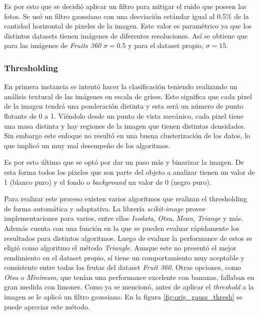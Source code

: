 \documentclass[10pt, a4paper]{article}
\begin{document}
Es por esto que se decidió aplicar un filtro para mitigar el ruido que poseen las fotos. Se usó un filtro gaussiano con una desviación estándar igual al 0.5\% de la cantidad horizontal de pixeles de la imagen. Este valor es paramétrico ya que los distintos datasets tienen imágenes de diferentes resoluciones. Así se obtiene que para las imágenes de \textit{Fruits 360} $\sigma = 0.5$ y para el dataset propio, $\sigma = 15$. 

\subsubsection{Thresholding}
\label{subsec:thresholding}

En primera instancia se intentó hacer la clasificación teniendo realizando un análisis textural de las imágenes en escala de grises. Esto significa que cada pixel de la imagen tendrá una ponderación distinta y esta será un número de punto flotante de 0 a 1. Viéndolo desde un punto de vista mecánico, cada pixel tiene una masa distinta y hay regiones de la imagen que tienen distintas densidades. Sin embargo este enfoque no resultó en una buena clusterización de los datos, lo que implicó un muy mal desempeño de los algoritmos.

Es por esto último que se optó por dar un paso más y binarizar la imagen. De esta forma todos los pixeles que son parte del objeto a analizar tienen un valor de 1 (blanco puro) y el fondo o \textit{background} un valor de 0 (negro puro).

Para realizar este proceso existen varios algoritmos que realizan el thresholding de forma automática y adaptativa. La librería \textit{scikit-image} provee implementaciones para varios, entre ellos \textit{Isodata}, \textit{Otsu}, \textit{Mean}, \textit{Triange} y más. Además cuenta con una función en la que se pueden evaluar rápidamente los resultados para distintos algoritmos. Luego de evaluar la performance de estos se eligió como algoritmo el método \textit{Triangle}. Aunque este no presentó el mejor rendimiento en el dataset propio, sí tiene un comportamiento muy aceptable y consistente entre todas las frutas del dataset \textit{Fruit 360}. Otras opciones, como \textit{Otsu} o \textit{Minimum}, que tenían una performance excelente con bananas, fallaban en gran medida con limones. Como ya se mencionó, antes de aplicar el \textit{threshold} a la imagen se le aplicó un filtro gaussiano. En la figura \ref{fig:orig_gauss_thresh} se puede apreciar este método.
\end{document}
